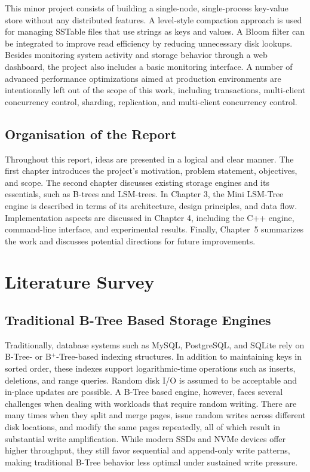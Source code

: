 \documentclass{mnitjaipur}
\begin{document}
This minor project consists of building a single-node, single-process key-value store without any distributed features. A level-style compaction approach is used for managing SSTable files that use strings as keys and values. A Bloom filter can be integrated to improve read efficiency by reducing unnecessary disk lookups. Besides monitoring system activity and storage behavior through a web dashboard, the project also includes a basic monitoring interface. A number of advanced performance optimizations aimed at production environments are intentionally left out of the scope of this work, including transactions, multi-client concurrency control, sharding, replication, and multi-client concurrency control.

\section{Organisation of the Report}

Throughout this report, ideas are presented in a logical and clear manner. The first chapter introduces the project's motivation, problem statement, objectives, and scope. The second chapter discusses existing storage engines and its essentials, such as B-trees and LSM-trees. In Chapter 3, the Mini LSM-Tree engine is described in terms of its architecture, design principles, and data flow. Implementation aspects are discussed in Chapter 4, including the C++ engine, command-line interface, and experimental results. Finally, Chapter~5 summarizes the work and discusses potential directions for future improvements.

\newpage

\chapter{Literature Survey}

\section{Traditional B-Tree Based Storage Engines}

Traditionally, database systems such as MySQL, PostgreSQL, and SQLite rely on B-Tree- or B$^{+}$-Tree-based indexing structures. In addition to maintaining keys in sorted order, these indexes support logarithmic-time operations such as inserts, deletions, and range queries. Random disk I/O is assumed to be acceptable and in-place updates are possible. A B-Tree based engine, however, faces several challenges when dealing with workloads that require random writing. There are many times when they split and merge pages, issue random writes across different disk locations, and modify the same pages repeatedly, all of which result in substantial write amplification. While modern SSDs and NVMe devices offer higher throughput, they still favor sequential and append-only write patterns, making traditional B-Tree behavior less optimal under sustained write pressure.
\end{document}
